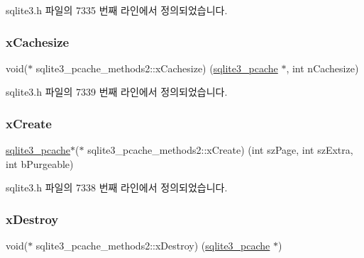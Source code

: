 sqlite3.\+h 파일의 7335 번째 라인에서 정의되었습니다.

\mbox{\label{structsqlite3__pcache__methods2_a76de689adc20fdbfef427b1c7ae1bcea}} 
\subsubsection{\texorpdfstring{x\+Cachesize}{xCachesize}}
{\footnotesize\ttfamily void($\ast$ sqlite3\+\_\+pcache\+\_\+methods2\+::x\+Cachesize) (\hyperlink{sqlite3_8h_a096c453d937d51f7926d7d31c8e0bd2f}{sqlite3\+\_\+pcache} $\ast$, int n\+Cachesize)}



sqlite3.\+h 파일의 7339 번째 라인에서 정의되었습니다.

\mbox{\label{structsqlite3__pcache__methods2_aa8babc280d7ba89c6c279301d5a36d69}} 
\subsubsection{\texorpdfstring{x\+Create}{xCreate}}
{\footnotesize\ttfamily \hyperlink{sqlite3_8h_a096c453d937d51f7926d7d31c8e0bd2f}{sqlite3\+\_\+pcache}$\ast$($\ast$ sqlite3\+\_\+pcache\+\_\+methods2\+::x\+Create) (int sz\+Page, int sz\+Extra, int b\+Purgeable)}



sqlite3.\+h 파일의 7338 번째 라인에서 정의되었습니다.

\mbox{\label{structsqlite3__pcache__methods2_a17a43db31d015c29e44d68c752682365}} 
\subsubsection{\texorpdfstring{x\+Destroy}{xDestroy}}
{\footnotesize\ttfamily void($\ast$ sqlite3\+\_\+pcache\+\_\+methods2\+::x\+Destroy) (\hyperlink{sqlite3_8h_a096c453d937d51f7926d7d31c8e0bd2f}{sqlite3\+\_\+pcache} $\ast$)}



